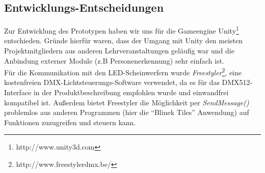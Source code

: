 \subsection{Entwicklungs-Entscheidungen}\label{ssec:entscheidungen}

Zur Entwicklung des Prototypen haben wir uns für die Gameengine Unity\footnote{http://www.unity3d.com} entschieden.
Gründe hierfür waren, dass der Umgang mit Unity den meisten Projektmitgliedern aus anderen Lehrveranstaltungen geläufig war und die Anbindung externer Module (z.B Personenerkennung) sehr einfach ist.\\
Für die Kommunikation mit den LED-Scheinwerfern wurde \emph{Freestyler}\footnote{http://www.freestylerdmx.be/}, eine kostenfreien DMX-Lichtsteuerungs-Software verwendet, da es für das DMX512-Interface in der Produktbeschreibung empfohlen wurde und einwandfrei kompatibel ist. Außerdem bietet Freestyler die Möglichkeit per \emph{SendMessage()} problemlos aus anderen Programmen (hier die "`Blinek Tiles"' Anwendung) auf Funktionen zuzugreifen und steuern kann.
